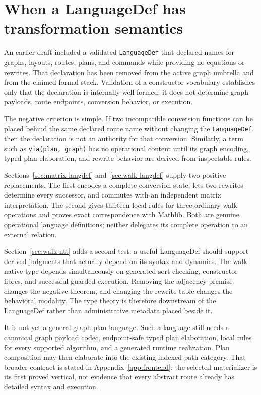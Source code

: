 \documentclass[11pt]{article}
\theoremstyle{remark}
\newcommand{\code}[1]{\texttt{#1}}
\begin{document}
\clearpage
\section{When a LanguageDef has transformation semantics}
\label{sec:vocabulary}

An earlier draft included a validated \code{LanguageDef} that declared names
for graphs, layouts, routes, plans, and commands while providing no equations
or rewrites.  That declaration has been removed from the active graph
umbrella and from the claimed formal stack.  Validation of a constructor
vocabulary establishes only that the declaration is internally well formed;
it does not determine graph payloads, route endpoints, conversion behavior,
or execution.

The negative criterion is simple.  If two incompatible conversion functions
can be placed behind the same declared route name without changing the
\code{LanguageDef}, then the declaration is not an authority for that
conversion.  Similarly, a term such as \code{via(plan, graph)} has no
operational content until its graph encoding, typed plan elaboration, and
rewrite behavior are derived from inspectable rules.

Sections~\ref{sec:matrix-langdef} and~\ref{sec:walk-langdef} supply two
positive replacements.  The first encodes a complete conversion state, lets
two rewrites determine every successor, and commutes with an independent
matrix interpretation.  The second gives thirteen local rules for three
ordinary walk operations and proves exact correspondence with Mathlib.  Both
are genuine operational language definitions; neither delegates its complete
operation to an external relation.

Section~\ref{sec:walk-ntt} adds a second test: a useful LanguageDef should
support derived judgments that actually depend on its syntax and dynamics.
The walk native type depends simultaneously on generated sort checking,
constructor fibres, and successful guarded execution.  Removing the adjacency
premise changes the negative theorem, and changing the rewrite table changes
the behavioral modality.  The type theory is therefore downstream of the
LanguageDef rather than administrative metadata placed beside it.

It is not yet a general graph-plan language.  Such a language still needs a
canonical graph payload codec, endpoint-safe typed plan elaboration, local
rules for every supported algorithm, and a generated runtime realization.
Plan composition may then elaborate into the existing indexed path category.
That broader contract is stated in Appendix~\ref{app:frontend}; the selected
materializer is its first proved vertical, not evidence that every abstract
route already has detailed syntax and execution.
\end{document}
